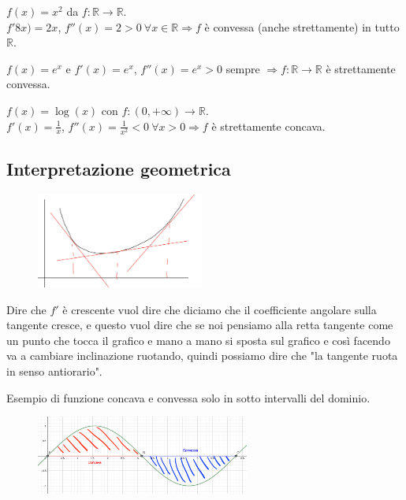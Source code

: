 \begin{example}
$f(x) = x^2$ da $f:\mathbb{R} \to \mathbb{R}$.\\
$f'8x) = 2x$, $f''(x) = 2 > 0 \: \forall x \in \mathbb{R} \Longrightarrow f$ è convessa (anche strettamente) in tutto $\mathbb{R}$.
\end{example}

\begin{example}
$f(x) = e^x$ e $f'(x) = e^x$, $f''(x) = e^x > 0$ sempre $\Longrightarrow f:\mathbb{R} \to \mathbb{R}$ è strettamente convessa.
\end{example}

\begin{example}
$f(x) = \log(x)$ con $f:(0,+\infty) \to \mathbb{R}$.\\
$f'(x) = \frac{1}{x}$, $f''(x) = \frac{1}{x^2} < 0 \: \forall x > 0 \Longrightarrow f$ è strettamente concava. 
\end{example}

\subsection{Interpretazione geometrica}
\begin{figure}
    \vspace{-13pt}
    \centering
    \includegraphics[width=5.5cm]{images/interpretazione-geometrica-convessita.png}
\end{figure}
Dire che $f'$ è crescente vuol dire che diciamo che il coefficiente angolare sulla tangente cresce, e questo vuol dire che se noi pensiamo alla retta tangente come un punto che tocca il grafico e mano a mano si sposta sul grafico e così facendo va a cambiare inclinazione ruotando, quindi possiamo dire che "la tangente ruota in senso antiorario".\\
\newpage
\begin{example}
Esempio di funzione concava e convessa solo in sotto intervalli del dominio.
\end{example}
\begin{figure}
    \vspace{-10pt}
    \centering
    \includegraphics[width=7cm]{images/seno-concavo-convesso.png}
\end{figure}

